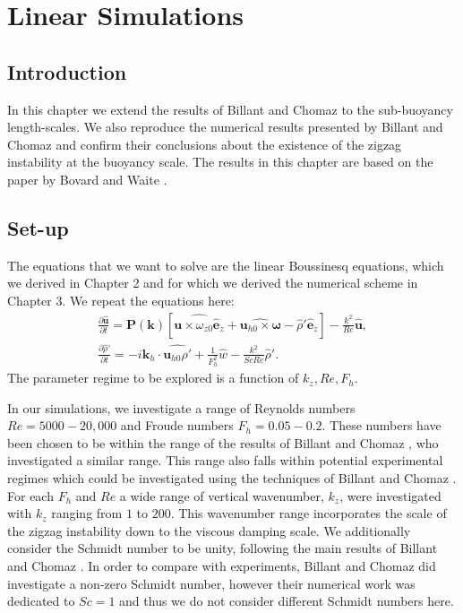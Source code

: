 \chapter{Linear Simulations}

\section{Introduction}
In this chapter we extend the results of Billant and Chomaz \cite{bc2000c} to the sub-buoyancy length-scales. We also reproduce the numerical results presented by Billant and Chomaz and confirm their conclusions about the existence of the zigzag instability at the buoyancy scale. The results in this chapter are based on the paper by Bovard and Waite \cite{bovard2013}.

\section{Set-up}
The equations that we want to solve are the linear Boussinesq equations, which we derived in Chapter 2 and for which we derived the numerical scheme in Chapter 3. We repeat the equations here:
\begin{align}
\frac{\partial \hat{\bm{u}}}{\partial t} = \textbf{P}(\textbf{k})[\widehat{\bm{u}\times \omega_{z0}\hat{\bm{e}}_{z}} + \widehat{\bm{u}_{h0}\times\bm{\omega}}-\hat{\rho}'\hat{\bm{e}}_{z}] - \frac{k^{2}}{Re}\hat{\bm{u}},\\
\frac{\partial\hat{\rho}'}{\partial t} = -i\bm{k}_{h}\cdot\widehat{\bm{u}_{h0}\rho'} + \frac{1}{F_{h}^{2}}\hat{w}- \frac{k^{2}}{ScRe}\hat{\rho}'.
\end{align} 
The parameter regime to be explored is a function of $k_{z},Re,F_{h}$. 

In our simulations, we investigate a range of Reynolds numbers $Re=5000-20{,}000$ and Froude numbers $F_{h}=0.05-0.2$. These numbers have been chosen to be within the range of the results of Billant and Chomaz \cite{bc2000c}, who investigated a similar range. This range also falls within potential experimental regimes which could be investigated using the techniques of Billant and Chomaz \cite{bc2000a}. For each $F_{h}$ and $Re$ a wide range of vertical wavenumber, $k_{z}$, were investigated with $k_{z}$ ranging from $1$ to $200$. This wavenumber range incorporates the scale of the zigzag instability down to the viscous damping scale. We additionally consider the Schmidt number to be unity, following the main results of Billant and Chomaz \cite{bc2000c}. In order to compare with experiments, Billant and Chomaz did investigate a non-zero Schmidt number, however their numerical work was dedicated to $Sc=1$ and thus we do not consider different Schmidt numbers here. 

